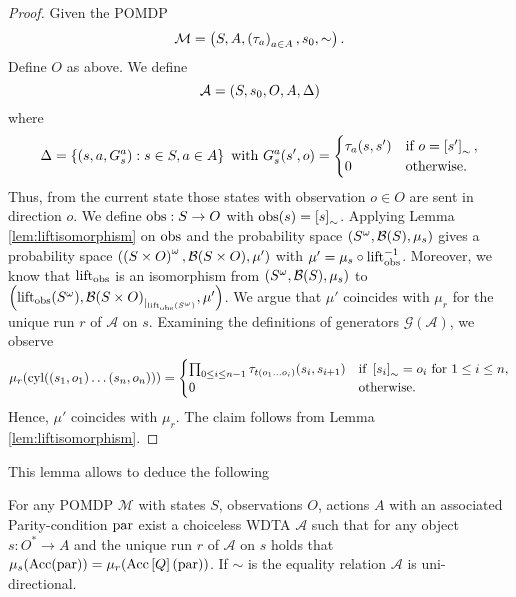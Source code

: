 \begin{proof}
  Given the \ac{POMDP}
  \begin{equation*}
    \mathcal{M} = \left(S, A, \left(\tau_{a}\right)_{a\in A}, s_{0}, \sim\right).
  \end{equation*}
  Define $O$ as above. We define
  \begin{equation*}
    \mathcal{A} = \left(S, s_{0}, O, A, \Delta\right)
  \end{equation*}
  where
  \begin{equation*}
    \Delta = \left\{\left(s, a, G_{s}^{a}\right):s\in S,a\in A\right\}\text{ with }
    G_{s}^{a}(s', o) = \begin{cases}
      \tau_{a}(s, s')&\text{if }o = \left[s'\right]_{\sim},\\
      0              &\text{otherwise.}
    \end{cases}
  \end{equation*}
  Thus, from the current state those states with observation $o\in O$ are sent
  in direction $o$. We define $\operatorname{obs}:S\rightarrow O$ with
  $\operatorname{obs}(s) = \left[s\right]_{\sim}$. Applying Lemma \ref{lem:liftisomorphism}
  on $\operatorname{obs}$ and the probability space $\left(S^{\omega}, \mathcal{B}(S),
  \mu_{s}\right)$ gives a probability space $\left(\left(S\times O\right)^{\omega},
  \mathcal{B}(S\times O), \mu'\right)$ with $\mu' = \mu_{s}\circ\operatorname{lift}_{\operatorname{obs}}^{-1}$.
  Moreover, we know that $\operatorname{lift}_{\operatorname{obs}}$ is an isomorphism from
  $\left(S^{\omega}, \mathcal{B}(S), \mu_{s}\right)$ to
  $\left(\operatorname{lift}_{\operatorname{obs}}(S^{\omega}),
    {\mathcal{B}(S\times O)}_{|_{\operatorname{lift}_{\operatorname{obs}}(S^{\omega})}}, \mu'\right)$.
  We argue that $\mu'$ coincides with $\mu_{r}$ for the unique run $r$ of
  $\mathcal{A}$ on $s$. Examining the definitions of generators
  $\mathcal{G}(\mathcal{A})$, we observe
  \begin{equation}
    \mu_{r}(\operatorname{cyl}(\left(s_{1},o_{1}\right)\dots\left(s_{n},o_{n}\right))) =
    \begin{cases}
      \prod_{0\leq i\leq n-1}\tau_{t(o_{1}\dots o_{i})}(s_{i}, s_{i+1})
        &\text{if }\left[s_{i}\right]_{\sim} = o_{i}\text{ for }1\leq i\leq n,\\
      0 &\text{otherwise}.
    \end{cases}
    \label{eq:wdtapomdp}
  \end{equation}
  Hence, $\mu'$ coincides with $\mu_{r}$. The claim follows from Lemma
  \ref{lem:liftisomorphism}.
\end{proof}
This lemma allows to deduce the following
\begin{theorem}
  For any \ac{POMDP} $\mathcal{M}$ with states $S$, observations $O$, actions
  $A$ with an associated Parity-condition $\operatorname{par}$ exist a choiceless
  \ac{WDTA} $\mathcal{A}$ such that for any object $s:O^{*}\rightarrow A$ and
  the unique run $r$ of $\mathcal{A}$ on $s$ holds that
  $\mu_{s}(\operatorname{Acc}(\operatorname{par})) = \mu_{r}(\operatorname{Acc}\left[Q\right](\operatorname{par}))$. If $\sim$ is
  the equality relation $\mathcal{A}$ is uni-directional.
  \label{thm:POMDPequivWDTA}
\end{theorem}
